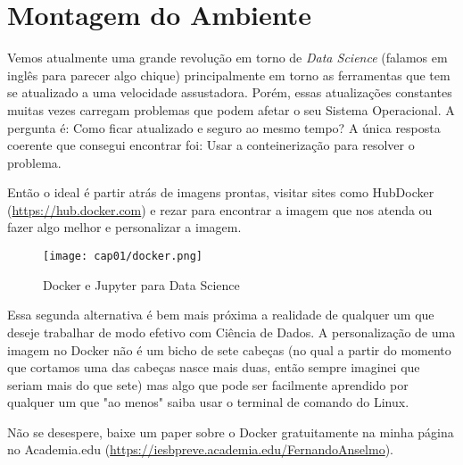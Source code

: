 \section{Montagem do Ambiente}
Vemos atualmente uma grande revolução em torno de \textit{Data Science} (falamos em inglês para parecer algo chique) principalmente em torno as ferramentas que tem se atualizado a uma velocidade assustadora. Porém, essas atualizações constantes muitas vezes carregam problemas que podem afetar o seu Sistema Operacional. A pergunta é: Como ficar atualizado e seguro ao mesmo tempo? A única resposta coerente que consegui encontrar foi: Usar a conteinerização para resolver o problema.

Então o ideal é partir atrás de imagens prontas, visitar sites como HubDocker (\url{https://hub.docker.com}) e rezar para encontrar a imagem que nos atenda ou fazer algo melhor e personalizar a imagem.
\begin{figure}[H]
	\centering\texttt{[image: cap01/docker.png]}
	\caption{Docker e Jupyter para Data Science}
\end{figure}

Essa segunda alternativa é bem mais próxima a realidade de qualquer um que deseje trabalhar de modo efetivo com Ciência de Dados. A personalização de uma imagem no Docker não é um bicho de sete cabeças (no qual a partir do momento que cortamos uma das cabeças nasce mais duas, então sempre imaginei que seriam mais do que sete) mas algo que pode ser facilmente aprendido por qualquer um que "ao menos" saiba usar o terminal de comando do Linux.

\begin{note} 
	Não se desespere, baixe um paper sobre o Docker gratuitamente na minha página no Academia.edu (\url{https://iesbpreve.academia.edu/FernandoAnselmo}).
\end{note}

